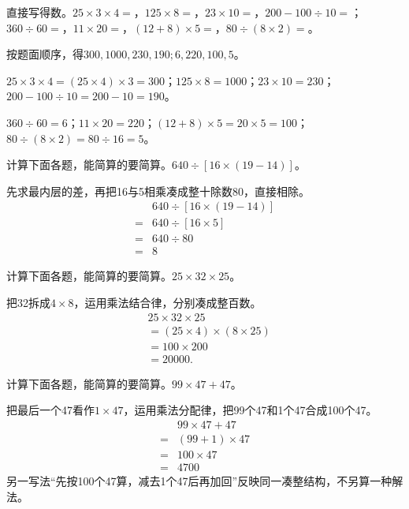 直接写得数。\(25\times3\times4=\)，\allowbreak{}\(125\times8=\)，\allowbreak{}\(23\times10=\)，\allowbreak{}\(200-100\div10=\)；\allowbreak{}\(360\div60=\)，\allowbreak{}\(11\times20=\)，\allowbreak{}\((12+8)\times5=\)，\allowbreak{}\(80\div(8\times2)=\)。\par
\begin{BookAnswer}
按题面顺序，得\(300,1000,230,190;6,220,100,5\)。\par \(25\times3\times4=(25\times4)\times3=300\)；\allowbreak{}\(125\times8=1000\)；\allowbreak{}\(23\times10=230\)；\allowbreak{}\(200-100\div10=200-10=190\)。\par \(360\div60=6\)；\allowbreak{}\(11\times20=220\)；\allowbreak{}\((12+8)\times5=20\times5=100\)；\allowbreak{}\(80\div(8\times2)=80\div16=5\)。
\end{BookAnswer}

计算下面各题，能简算的要简算。\(640\div[16\times(19-14)]\)。\par
\begin{BookAnswer}
先求最内层的差，再把16与5相乘凑成整十除数80，直接相除。\[\begin{aligned}&640\div[16\times(19-14)]\\={}&640\div[16\times5]\\={}&640\div80\\={}&8\end{aligned}\]
\end{BookAnswer}

计算下面各题，能简算的要简算。\(25\times32\times25\)。\par
\begin{BookAnswer}
把32拆成\(4\times8\)，运用乘法结合律，分别凑成整百数。\[\begin{aligned}&25\times32\times25\\&=(25\times4)\times(8\times25)\\&=100\times200\\&=20000.\end{aligned}\]
\end{BookAnswer}

计算下面各题，能简算的要简算。\(99\times47+47\)。\par
\begin{BookAnswer}
把最后一个47看作\(1\times47\)，运用乘法分配律，把99个47和1个47合成100个47。\[\begin{aligned}&99\times47+47\\={}&(99+1)\times47\\={}&100\times47\\={}&4700\end{aligned}\]另一写法“先按100个47算，减去1个47后再加回”反映同一凑整结构，不另算一种解法。
\end{BookAnswer}

